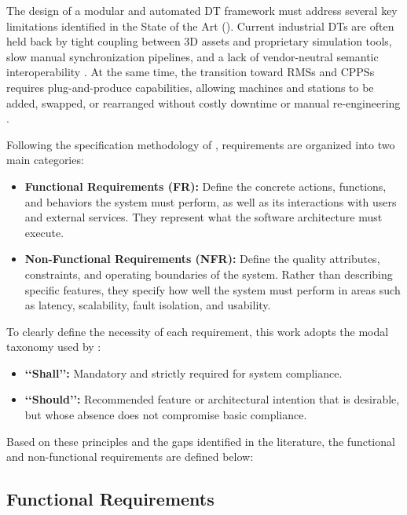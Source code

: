 The design of a modular and automated \gls{DT} framework must address several key limitations identified in the State of the Art (). Current industrial \glspl{DT} are often held back by tight coupling between 3D assets and proprietary simulation tools, slow manual synchronization pipelines, and a lack of vendor-neutral semantic interoperability \cite{Alexopoulos2025,Schaper2025}. At the same time, the transition toward \glspl{RMS} and \glspl{CPPS} requires plug-and-produce capabilities, allowing machines and stations to be added, swapped, or rearranged without costly downtime or manual re-engineering \cite{Rocha2024}.

Following the specification methodology of \textcite{Alemao2022}, requirements are organized into two main categories:
\begin{itemize}
    \item \textbf{Functional Requirements (FR):} Define the concrete actions, functions, and behaviors the system must perform, as well as its interactions with users and external services. They represent what the software architecture must execute.
    \item \textbf{Non-Functional Requirements (NFR):} Define the quality attributes, constraints, and operating boundaries of the system. Rather than describing specific features, they specify how well the system must perform in areas such as latency, scalability, fault isolation, and usability.
\end{itemize}

To clearly define the necessity of each requirement, this work adopts the modal taxonomy used by \textcite{Alemao2022}:
\begin{itemize}
    \item \textbf{‘‘Shall’’:} Mandatory and strictly required for system compliance.
    \item \textbf{‘‘Should’’:} Recommended feature or architectural intention that is desirable, but whose absence does not compromise basic compliance.
\end{itemize}

Based on these principles and the gaps identified in the literature, the functional and non-functional requirements are defined below:

\subsection{Functional Requirements}

